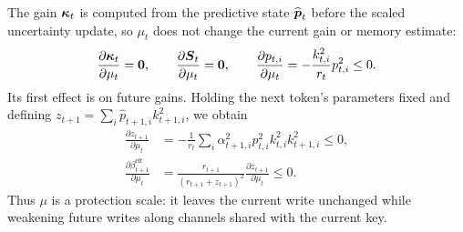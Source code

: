 \documentclass{article} %
\begin{document}
The gain $\boldsymbol{\kappa}_t$ is computed from the predictive state $\widehat{\boldsymbol{p}}_t$ before the
scaled uncertainty update, so $\mu_t$ does not change the current gain or memory estimate:
\begin{equation}
  \frac{\partial\boldsymbol{\kappa}_t}{\partial\mu_t}=\boldsymbol{0},
  \qquad
  \frac{\partial\boldsymbol{S}_t}{\partial\mu_t}=\boldsymbol{0},
  \qquad
  \frac{\partial p_{t,i}}{\partial\mu_t}
  =-\frac{k_{t,i}^2}{r_t}p_{t,i}^2\leq0.
  \label{eq:appendix-protection-current-invariance}
\end{equation}
Its first effect is on future gains. Holding the next token's parameters fixed and defining
$z_{t+1}=\sum_i\widehat p_{t+1,i}k_{t+1,i}^2$, we obtain
\begin{equation}
\begin{aligned}
  \frac{\partial z_{t+1}}{\partial\mu_t}
  &=-\frac{1}{r_t}\sum_i
    \alpha_{t+1,i}^2p_{t,i}^2k_{t,i}^2k_{t+1,i}^2\leq0, \\
  \frac{\partial\beta_{t+1}^{\mathrm{eff}}}{\partial\mu_t}
  &=\frac{r_{t+1}}{(r_{t+1}+z_{t+1})^2}
    \frac{\partial z_{t+1}}{\partial\mu_t}\leq0.
\end{aligned}
  \label{eq:appendix-protection-future-write}
\end{equation}
Thus $\mu$ is a protection scale: it leaves the current write unchanged while weakening future
writes along channels shared with the current key.
\end{document}
